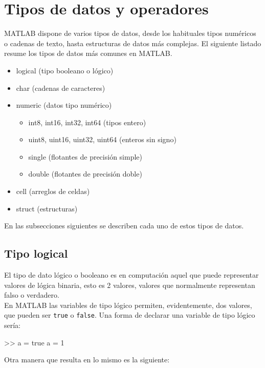 \section{Tipos de datos y operadores}

MATLAB dispone de varios tipos de datos, desde los habituales tipos numéricos o cadenas de texto, hasta estructuras 
de datos más complejas. El siguiente listado resume los tipos de datos más comunes en MATLAB.

\begin{itemize}[nolistsep]
\item logical  (tipo booleano o lógico)
\item char (cadenas de caracteres)
\item numeric (datos tipo numérico)
\begin{itemize}[nolistsep]
   \item int8, int16, int32, int64 (tipos entero)
   \item uint8, uint16, uint32, uint64  (enteros sin signo)
   \item single (flotantes de precisión simple)
   \item double  (flotantes de precisión doble)
\end{itemize}
\item cell (arreglos de celdas)
\item struct (estructuras)
\end{itemize}

En las subsecciones siguientes se describen cada uno de estos tipos de datos.

\subsection{Tipo logical}

El tipo de dato lógico o booleano es en computación aquel que puede 
representar valores de lógica binaria, esto es 2 valores, valores 
que normalmente representan falso o verdadero. \\

En MATLAB las variables de tipo lógico permiten, evidentemente, dos valores, que
pueden ser \texttt{true} o \texttt{false}. Una forma de declarar una
variable de tipo lógico sería:

\begin{matlab}
>> a = true
a =
     1
\end{matlab}

Otra manera que resulta en lo mismo es la siguiente:

